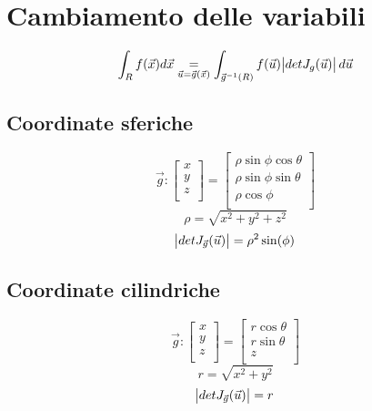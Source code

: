 \documentclass[a4paper,portrait,columns=3,5pt]{cheatsheet}
\begin{document}
\section{Cambiamento delle variabili}
\begin{equation*}
	\int_R f(\vec {x}) d\vec{x} \underset{{\vec{u} = \vec{g} (\vec{x})}}{=} \int_{\vec{g}^{-1}(R)} f(\vec {u}) \abs{det J_g(\vec u)} d\vec{u}
\end{equation*}

\subsection{Coordinate sferiche}
\begin{equation*}
	\vec{g} :
	\begin{bmatrix}
		x \\
		y \\
		z \\
	\end{bmatrix} =
	\begin{bmatrix}
		\rho \sin \phi \cos \theta \\
		\rho \sin \phi \sin \theta \\
		\rho \cos \phi             \\
	\end{bmatrix}
\end{equation*}
\begin{equation*}
	\rho = \sqrt{x^2 + y^2 + z^2}
\end{equation*}
\begin{equation*}
	\abs{detJ_{\vec{g}}(\vec{u})} = \rho^2 \sin(\phi)
\end{equation*}
\subsection{Coordinate cilindriche}
\begin{equation*}
	\vec{g} :
	\begin{bmatrix}
		x \\
		y \\
		z \\
	\end{bmatrix} =
	\begin{bmatrix}
		r \cos \theta \\
		r \sin \theta \\
		z             \\
	\end{bmatrix}
\end{equation*}
\begin{equation*}
	r = \sqrt{x^2 + y^2}
\end{equation*}
\begin{equation*}
	\abs{detJ_{\vec{g}}(\vec{u})} = r
\end{equation*}
\end{document}

